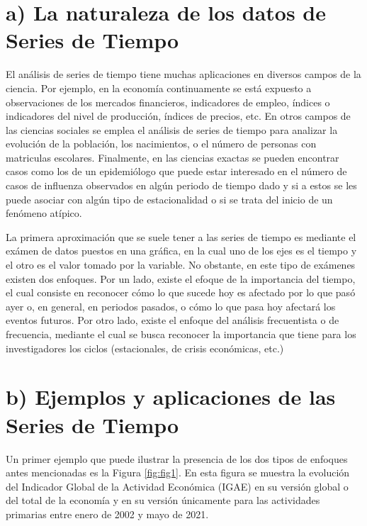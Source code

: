 \documentclass[
]{book}
\begin{document}
\hypertarget{a-la-naturaleza-de-los-datos-de-series-de-tiempo}{%
\section{a) La naturaleza de los datos de Series de Tiempo}\label{a-la-naturaleza-de-los-datos-de-series-de-tiempo}}

El análisis de series de tiempo tiene muchas aplicaciones en diversos campos de la ciencia. Por ejemplo, en la economía continuamente se está expuesto a observaciones de los mercados financieros, indicadores de empleo, índices o indicadores del nivel de producción, índices de precios, etc. En otros campos de las ciencias sociales se emplea el análisis de series de tiempo para analizar
la evolución de la población, los nacimientos, o el número de personas con matriculas escolares. Finalmente, en las ciencias exactas se pueden encontrar casos como los de un epidemiólogo que puede estar interesado en el número de casos de influenza observados en algún periodo de tiempo dado y si a estos se les puede asociar con algún tipo de estacionalidad o si se trata del inicio de un fenómeno atípico.

La primera aproximación que se suele tener a las series de tiempo es mediante el exámen de datos puestos en una gráfica, en la cual uno de los ejes es el tiempo y el otro es el valor tomado por la variable. No obstante, en este tipo de exámenes existen dos enfoques. Por un lado, existe el efoque de la importancia del tiempo, el cual consiste en reconocer cómo lo que sucede hoy es afectado por lo que pasó ayer o, en general, en periodos pasados, o cómo lo que pasa hoy afectará los eventos futuros. Por otro lado, existe el enfoque del análisis frecuentista o de frecuencia, mediante el cual se busca reconocer la importancia que tiene para los investigadores los ciclos (estacionales, de crisis económicas, etc.)

\hypertarget{b-ejemplos-y-aplicaciones-de-las-series-de-tiempo}{%
\section{b) Ejemplos y aplicaciones de las Series de Tiempo}\label{b-ejemplos-y-aplicaciones-de-las-series-de-tiempo}}

Un primer ejemplo que puede ilustrar la presencia de los dos tipos de
enfoques antes mencionadas es la Figura \ref{fig:fig1}. En esta figura se muestra la evolución del Indicador Global de la Actividad Económica (IGAE) en su versión global o del total de la economía y en su versión únicamente para las actividades primarias entre enero de 2002 y mayo de 2021.
\end{document}
